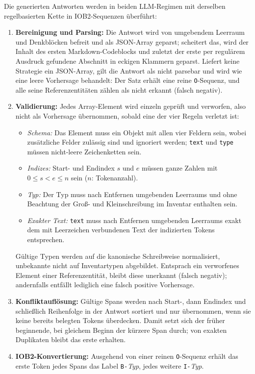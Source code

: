 Die generierten Antworten werden in beiden LLM-Regimen mit derselben
regelbasierten Kette in IOB2-Sequenzen überführt:

\begin{enumerate}
    \item \textbf{Bereinigung und Parsing:} Die Antwort wird von
    umgebendem Leerraum und Denkblöcken befreit und als JSON-Array
    geparst; scheitert das, wird der Inhalt des ersten
    Markdown-Codeblocks und zuletzt der erste per regulärem Ausdruck
    gefundene Abschnitt in eckigen Klammern geparst.
    Liefert keine Strategie ein JSON-Array, gilt die Antwort als nicht
    parsebar und wird wie eine leere Vorhersage behandelt: Der Satz
    erhält eine reine \texttt{O}-Sequenz, und alle seine
    Referenzentitäten zählen als nicht erkannt (falsch negativ).

    \item \textbf{Validierung:} Jedes Array-Element wird einzeln geprüft
    und verworfen, also nicht als Vorhersage übernommen, sobald eine der
    vier Regeln verletzt ist:
    \begin{itemize}
        \item \emph{Schema:} Das Element muss ein Objekt mit allen vier
        Feldern sein, wobei zusätzliche Felder zulässig sind und ignoriert
        werden; \texttt{text} und \texttt{type} müssen nicht-leere
        Zeichenketten sein.
        \item \emph{Indizes:} Start- und Endindex $s$ und $e$ müssen
        ganze Zahlen mit $0 \leq s < e \leq n$ sein ($n$: Tokenanzahl).
        \item \emph{Typ:} Der Typ muss nach Entfernen umgebenden
        Leerraums und ohne Beachtung der Groß- und Kleinschreibung im
        Inventar enthalten sein.
        \item \emph{Exakter Text:} \texttt{text} muss nach Entfernen
        umgebenden Leerraums exakt dem mit Leerzeichen verbundenen Text
        der indizierten Tokens entsprechen.
    \end{itemize}
    Gültige Typen werden auf die kanonische Schreibweise normalisiert,
    unbekannte nicht auf Inventartypen abgebildet.
    Entsprach ein verworfenes Element einer Referenzentität, bleibt
    diese unerkannt (falsch negativ); andernfalls entfällt lediglich
    eine falsch positive Vorhersage.

    \item \textbf{Konfliktauflösung:} Gültige Spans werden nach Start-,
    dann Endindex und schließlich Reihenfolge in der Antwort sortiert und
    nur übernommen, wenn sie keine bereits belegten Tokens überdecken.
    Damit setzt sich der früher beginnende, bei gleichem Beginn der
    kürzere Span durch; von exakten Duplikaten bleibt das erste erhalten.

    \item \textbf{IOB2-Konvertierung:} Ausgehend von einer reinen
    \texttt{O}-Sequenz erhält das erste Token jedes Spans das Label
    \texttt{B-}\emph{Typ}, jedes weitere \texttt{I-}\emph{Typ}.
\end{enumerate}

